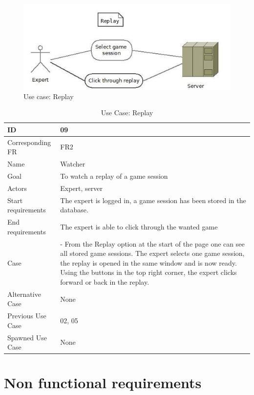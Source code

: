 \begin{figure}[H]
  \centering
    \includegraphics[width=1.0\textwidth]{img/replay.jpg}
  \caption{Use case: Replay} 
  \label{fig:replay}
\end{figure}


\begin{table}[H]
\begin{tabular}{|l|p{14cm}|}
\hline
	\textbf{ID} & \textbf{09}\\ \hline
	Corresponding FR & FR2\\ \hline
	Name & Watcher\\ \hline
	Goal & To watch a replay of a game session\\ \hline
	Actors & Expert, server\\ \hline
	Start requirements & The expert is logged in, a game session has been stored in the database. \\ \hline
	End requirements & The expert is able to click through the wanted game\\ \hline
	Case & - From the Replay option at the start of the page one can see all stored game sessions. The expert selects one game session, the replay is opened in the same window and is now ready. Using the buttons in the top right corner, the expert clicks forward or back in the replay.\\
	Alternative Case & None \\ \hline
	Previous Use Case & 02, 05\\ \hline
	Spawned Use Case & None\\ \hline
\end{tabular}
\caption{Use Case: Replay}
\label{fig:usecase09table}
\end{table}






\section{Non functional requirements} 


